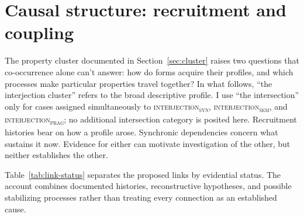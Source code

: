 \documentclass[12pt]{article}
\newcommand{\intj}[1]{\textsc{interjection\textsubscript{#1}}}
\begin{document}
\section[Causal structure]{Causal structure: recruitment and coupling}\label{sec:causal-structure}

The property cluster documented in Section~\ref{sec:cluster} raises two questions that co-occurrence alone can't answer: how do forms acquire their profiles, and which processes make particular properties travel together? In what follows, \enquote{the interjection cluster} refers to the broad descriptive profile. I use \enquote{the intersection} only for cases assigned simultaneously to \intj{syn}, \intj{sem}, and \intj{prag}; no additional intersection category is posited here. Recruitment histories bear on how a profile arose. Synchronic dependencies concern what sustains it now. Evidence for either can motivate investigation of the other, but neither establishes the other.

Table~\ref{tab:link-status} separates the proposed links by evidential status. The account combines documented histories, reconstructive hypotheses, and possible stabilizing processes rather than treating every connection as an established cause.
\end{document}
